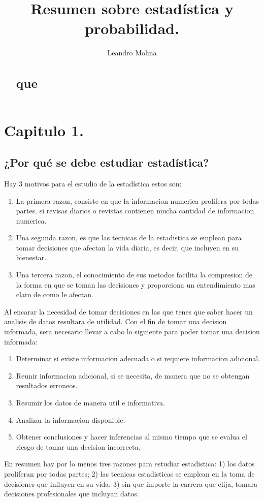 \documentclass[]{article}
\title{Resumen sobre estadística y probabilidad.}
\author{Leandro Molina}
\begin{document}
\maketitle

\begin{abstract}
	\section*{que}
\end{abstract}
\pagebreak

\tableofcontents

\pagebreak
\section{Capitulo 1.}
\subsection{¿Por qué se debe estudiar estadística?}
Hay 3 motivos para el estudio de la estadística estos son:
\begin{enumerate}
	\item La primera razon, consiste en que la informacion numerica prolifera por todas partes. si revisas diarios o revistas contienen mucha cantidad de informacion numerica.
	\item Una segunda razon, es que las tecnicas de la estadistica se emplean para tomar decisiones que afectan la vida diaria, es decir, que incluyen en su bienestar.
	\item Una tercera razon, el conocimiento de sus metodos facilita la compresion de la forma en que se toman las decisiones y proporciona un entendimiento mas claro de como le afectan. 
\end{enumerate}
Al encarar la necesidad de tomar decisiones en las que tenes que saber hacer un analisis de datos resultara de utilidad. Con el fin de tomar una decision informada, sera necesario llevar a cabo lo siguiente para poder tomar una decision informada:
\begin{enumerate}
	\item Determinar si existe informacion adecuada o si requiere informacion adicional.
	\item Reunir informacion adicional, si se necesita, de manera que no se obtengan resultados erroneos.
	\item Resumir los datos de manera util e informativa.
	\item Analizar la informacion disponible.
	\item Obtener conclusiones y hacer inferencias al mismo tiempo que se evalua el riesgo de tomar una decision incorrecta.
\end{enumerate}
En resumen hay por lo menos tres razones para estudiar estadistica: 1) los datos proliferan por todas partes; 2) las tecnicas estadisticas se emplean en la toma de decisiones que influyen en su vida; 3) sin que importe la carrera que elija, tomara decisiones profesionales que incluyan datos.
\end{document}
